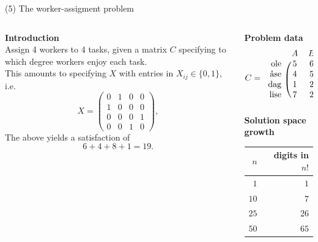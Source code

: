 \documentclass[11pt, aspectratio=149]{beamer}
\theoremstyle{plain}
\begin{document}
\begin{frame}[fragile, t]{(5) The worker-assigment problem}
	\begin{columns}
		\begin{column}{0.6\textwidth}
			\textbf{Introduction}\\ \vspace*{0.5em} 
			Assign 4 workers to 4 tasks, given a matrix $C$ specifying to which degree workers enjoy each task.
			\\
			\vspace*{0.5em} 
			This amounts to specifying
			$X$ with entries in $X_{ij} \in \{0, 1\}$, i.e.
			\begin{equation*}
				X = \begin{pmatrix}
				0 & 1 & 0 & 0\\ 
				1 & 0 & 0 & 0\\ 
				0 & 0 & 0 & 1 \\ 
				0 & 0 & 1 & 0
				\end{pmatrix},
			\end{equation*}
			The above yields a satisfaction of
			\begin{equation*}
				6 + 4 + 8 + 1 = 19.
			\end{equation*}
			
			
		\end{column}
		\begin{column}{0.4\textwidth}%
			\textbf{Problem data}
			\[
			C = 
			\begin{blockarray}{rcccc}
			& A & B & C & D  \\
			\begin{block}{r(cccc)}
			\text{ole}  & 5 &  6 & 1 &  6 \\
			\text{åse}  & 4 &  5 & 0 &  1 \\
			\text{dag}  & 1 &  2 & 6 &  8 \\
			\text{lise} & 7 &  2 & 1 &  1 \\
			\end{block}
			\end{blockarray}
			\]
			\textbf{Solution space growth}
			\begin{tabular}{rr}
				\toprule 
				$n$ & digits in $n!$  \\ \midrule
				$1$ & $1$ \\
				$10$ & $7$   \\
				$25$ & $26$   \\
				$50$ & $65$ \\ \bottomrule
			\end{tabular}
		\end{column}
		
		
	\end{columns}
\end{frame}
\end{document}
